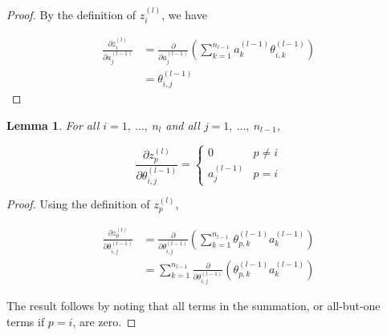 \documentclass{article}[11pt]
\newtheorem{lemma}{Lemma}
\begin{document}
        \begin{proof}
            
            By the definition of $z^{(l)}_i$, we have
            
            $$ \begin{aligned}
            \frac{\partial z^{(l)}_i}{\partial a^{(l-1)}_j}
            &= \frac{\partial}{\partial a^{(l-1)}_j} \left( \sum_{k = 1}^{n_{l-1}} a^{(l-1)}_k \theta^{(l-1)}_{i,k} \right) \\
            &= \theta^{(l-1)}_{i,j}
            \end{aligned} $$
            
        \end{proof}
        
        
        
        
        \begin{lemma}
            
            For all $i = 1, \ \ldots, \ n_l$ and all $j = 1, \ \ldots, \ n_{l-1}$,
            
            $$
            \frac{\partial z^{(l)}_p}{\partial \theta^{(l-1)}_{i,j}} = \begin{cases}
                0 & p \neq i \\
                a^{(l-1)}_j & p = i
            \end{cases}
            $$
            
        \end{lemma}
        
        \begin{proof}
            
            Using the definition of $z^{(l)}_p$,
            
            $$ \begin{aligned}
            \frac{\partial z^{(l)}_p}{\partial \theta^{(l-1)}_{i,j}}
            &= \frac{\partial}{\partial \theta^{(l-1)}_{i,j}} \left( \sum_{k=1}^{n_{l-1}} \theta^{(l-1)}_{p,k} a^{(l-1)}_k \right) \\
            &= \sum_{k=1}^{n_{l-1}} \frac{\partial}{\partial \theta^{(l-1)}_{i,j}} \left( \theta^{(l-1)}_{p,k} a^{(l-1)}_k \right)
            \end{aligned} $$
            
            The result follows by noting that all terms in the summation, or all-but-one terms if $p = i$, are zero.
            
        \end{proof}
        
\end{document}
